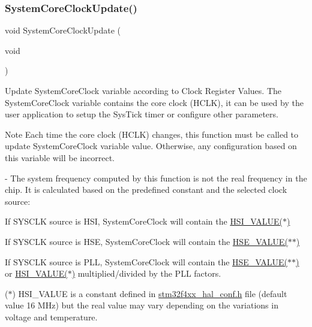 \subsubsection{\texorpdfstring{SystemCoreClockUpdate()}{SystemCoreClockUpdate()}}
{\footnotesize\ttfamily void System\+Core\+Clock\+Update (\begin{DoxyParamCaption}\item[{void}]{ }\end{DoxyParamCaption})}



Update System\+Core\+Clock variable according to Clock Register Values. The System\+Core\+Clock variable contains the core clock (H\+C\+LK), it can be used by the user application to setup the Sys\+Tick timer or configure other parameters. 

\begin{DoxyNote}{Note}
Each time the core clock (H\+C\+LK) changes, this function must be called to update System\+Core\+Clock variable value. Otherwise, any configuration based on this variable will be incorrect.

-\/ The system frequency computed by this function is not the real frequency in the chip. It is calculated based on the predefined constant and the selected clock source\+:
\end{DoxyNote}

\begin{DoxyItemize}
\item If S\+Y\+S\+C\+LK source is H\+SI, System\+Core\+Clock will contain the \mbox{\hyperlink{group___s_t_m32_f4xx___system___private___includes_gaaa8c76e274d0f6dd2cefb5d0b17fbc37}{H\+S\+I\+\_\+\+V\+A\+L\+U\+E($\ast$)}}
\item If S\+Y\+S\+C\+LK source is H\+SE, System\+Core\+Clock will contain the \mbox{\hyperlink{group___s_t_m32_f4xx___system___private___includes_gaeafcff4f57440c60e64812dddd13e7cb}{H\+S\+E\+\_\+\+V\+A\+L\+U\+E($\ast$$\ast$)}}
\item If S\+Y\+S\+C\+LK source is P\+LL, System\+Core\+Clock will contain the \mbox{\hyperlink{group___s_t_m32_f4xx___system___private___includes_gaeafcff4f57440c60e64812dddd13e7cb}{H\+S\+E\+\_\+\+V\+A\+L\+U\+E($\ast$$\ast$)}} or \mbox{\hyperlink{group___s_t_m32_f4xx___system___private___includes_gaaa8c76e274d0f6dd2cefb5d0b17fbc37}{H\+S\+I\+\_\+\+V\+A\+L\+U\+E($\ast$)}} multiplied/divided by the P\+LL factors.
\end{DoxyItemize}

($\ast$) H\+S\+I\+\_\+\+V\+A\+L\+UE is a constant defined in \mbox{\hyperlink{stm32f4xx__hal__conf_8h_source}{stm32f4xx\+\_\+hal\+\_\+conf.\+h}} file (default value 16 M\+Hz) but the real value may vary depending on the variations in voltage and temperature.

